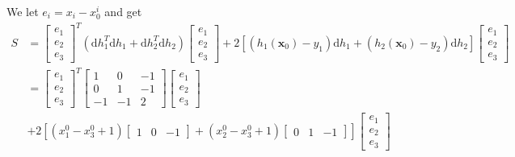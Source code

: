 We let $e_i = x_i - x_0^i$ and get
$$
  \begin{aligned}
    S & = \begin{bmatrix}
      e_1 \\ e_2 \\ e_3
    \end{bmatrix}^T \left( \mathrm{d} h_1^T \mathrm{d} h_1 + \mathrm{d} h_2^T \mathrm{d} h_2 \right) \begin{bmatrix}
      e_1 \\ e_2 \\ e_3
    \end{bmatrix} + 2 \left[ (h_1(\mathbf{x}_0) - y_1) \mathrm{d}h_1 + (h_2(\mathbf{x}_0) - y_2)\mathrm{d}h_2 \right] \begin{bmatrix}
      e_1 \\ e_2 \\ e_3
    \end{bmatrix} \\
      & = \begin{bmatrix}
      e_1 \\ e_2 \\ e_3
    \end{bmatrix}^T \begin{bmatrix}
      1 & 0 & -1 \\ 0 & 1 & -1 \\ -1 & -1 & 2
    \end{bmatrix} \begin{bmatrix}
      e_1 \\ e_2 \\ e_3
    \end{bmatrix}                                                                                                                                                                                      \\
      & + 2 \left[ (x_1^0 - x_3^0 +1) \begin{bmatrix}
        1 & 0 & -1
      \end{bmatrix} + (x_2^0 - x_3^0 + 1) \begin{bmatrix}
        0 & 1 & -1
      \end{bmatrix} \right] \begin{bmatrix}
      e_1 \\ e_2 \\ e_3
    \end{bmatrix}                                                                                                                              \\

\end{aligned}$$

